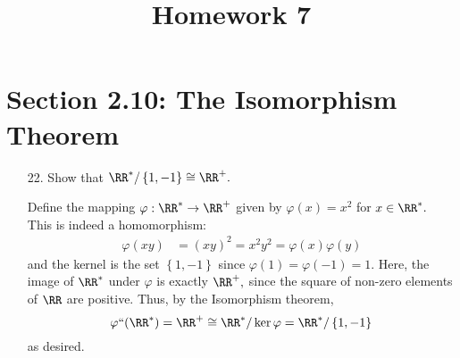 \documentclass{article}
\begin{document}
\title{Homework 7}
\maketitle
\thispagestyle{fancy}

\section*{Section 2.10: The Isomorphism Theorem}

\begin{itemize}
	\item[22.] Show that $\RR^*/\left\{ 1, -1 \right\}\cong \RR^+.$
		\begin{soln}
			Define the mapping $\varphi:\RR^*\to \RR^+$ given by $\varphi(x)=x^2$ for $x\in \RR^*.$ This is indeed a homomorphism:
			\begin{align*}
				\varphi(xy) &= (xy)^2 = x^2 y^2 = \varphi(x)\varphi(y)
			\end{align*} and the kernel is the set $\left\{ 1, -1 \right\}$ since $\varphi(1)=\varphi(-1)=1.$ Here, the image of $\RR^*$ under $\varphi$ is exactly $\RR^+,$ since the square of non-zero elements of $\RR$ are positive. Thus, by the Isomorphism theorem, \[\varphi``(\RR^*)=\RR^+\cong \RR^*/\ker \varphi = \RR^*/\left\{ 1, -1 \right\}\] as desired.
			
		\end{soln}


\end{itemize}
\end{document}
